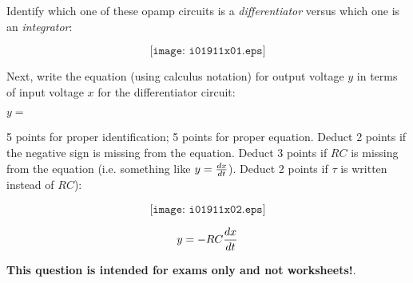 

Identify which one of these opamp circuits is a {\it differentiator} versus which one is an {\it integrator}:

$$\texttt{[image: i01911x01.eps]}$$

Next, write the equation (using calculus notation) for output voltage $y$ in terms of input voltage $x$ for the differentiator circuit:

\vskip 10pt

$y = $







5 points for proper identification; 5 points for proper equation.  Deduct 2 points if the negative sign is missing from the equation.  Deduct 3 points if $RC$ is missing from the equation (i.e. something like $y = {dx \over dt}$).  Deduct 2 points if $\tau$ is written instead of $RC$):

$$\texttt{[image: i01911x02.eps]}$$

$$y = -RC {dx \over dt}$$







{\bf This question is intended for exams only and not worksheets!}.




